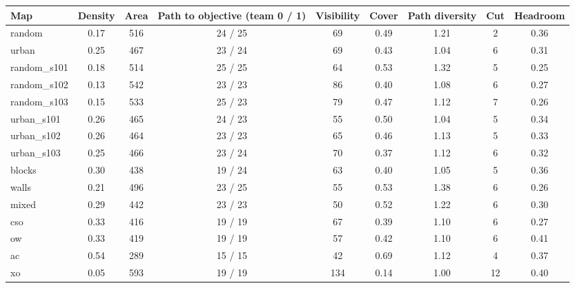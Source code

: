 \begin{tabular}{lcccccccc}
\toprule
Map & Density & Area & Path to objective (team 0 / 1) & Visibility & Cover & Path diversity & Cut & Headroom \\
\midrule
random & 0.17 & 516 & 24 / 25 & 69 & 0.49 & 1.21 & 2 & 0.36 \\
urban & 0.25 & 467 & 23 / 24 & 69 & 0.43 & 1.04 & 6 & 0.31 \\
random\_s101 & 0.18 & 514 & 25 / 25 & 64 & 0.53 & 1.32 & 5 & 0.25 \\
random\_s102 & 0.13 & 542 & 23 / 23 & 86 & 0.40 & 1.08 & 6 & 0.27 \\
random\_s103 & 0.15 & 533 & 25 / 23 & 79 & 0.47 & 1.12 & 7 & 0.26 \\
urban\_s101 & 0.26 & 465 & 24 / 23 & 55 & 0.50 & 1.04 & 5 & 0.34 \\
urban\_s102 & 0.26 & 464 & 23 / 23 & 65 & 0.46 & 1.13 & 5 & 0.33 \\
urban\_s103 & 0.25 & 466 & 23 / 24 & 70 & 0.37 & 1.12 & 6 & 0.32 \\
blocks & 0.30 & 438 & 19 / 24 & 63 & 0.40 & 1.05 & 5 & 0.36 \\
walls & 0.21 & 496 & 23 / 25 & 55 & 0.53 & 1.38 & 6 & 0.26 \\
mixed & 0.29 & 442 & 23 / 23 & 50 & 0.52 & 1.22 & 6 & 0.30 \\
cso & 0.33 & 416 & 19 / 19 & 67 & 0.39 & 1.10 & 6 & 0.27 \\
ow & 0.33 & 419 & 19 / 19 & 57 & 0.42 & 1.10 & 6 & 0.41 \\
ac & 0.54 & 289 & 15 / 15 & 42 & 0.69 & 1.12 & 4 & 0.37 \\
xo & 0.05 & 593 & 19 / 19 & 134 & 0.14 & 1.00 & 12 & 0.40 \\
\bottomrule
\end{tabular}
